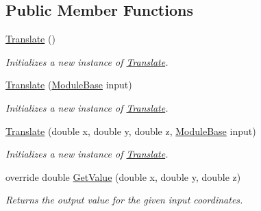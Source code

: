 \subsection*{Public Member Functions}
\begin{DoxyCompactItemize}
\item 
\hyperlink{class_lib_noise_1_1_operator_1_1_translate_aaf0a958990e1846f397693b79d7602c6}{Translate} ()
\begin{DoxyCompactList}\small\item\em Initializes a new instance of \hyperlink{class_lib_noise_1_1_operator_1_1_translate}{Translate}. \end{DoxyCompactList}\item 
\hyperlink{class_lib_noise_1_1_operator_1_1_translate_ae88ec3ed85565ee0f0821de84ea7f44c}{Translate} (\hyperlink{class_lib_noise_1_1_module_base}{Module\+Base} input)
\begin{DoxyCompactList}\small\item\em Initializes a new instance of \hyperlink{class_lib_noise_1_1_operator_1_1_translate}{Translate}. \end{DoxyCompactList}\item 
\hyperlink{class_lib_noise_1_1_operator_1_1_translate_abb2dcc0a48f69bac445064c6df032fce}{Translate} (double x, double y, double z, \hyperlink{class_lib_noise_1_1_module_base}{Module\+Base} input)
\begin{DoxyCompactList}\small\item\em Initializes a new instance of \hyperlink{class_lib_noise_1_1_operator_1_1_translate}{Translate}. \end{DoxyCompactList}\item 
override double \hyperlink{class_lib_noise_1_1_operator_1_1_translate_a2e440441f2d8258a7f93dc6306947a94}{Get\+Value} (double x, double y, double z)
\begin{DoxyCompactList}\small\item\em Returns the output value for the given input coordinates. \end{DoxyCompactList}\end{DoxyCompactItemize}
